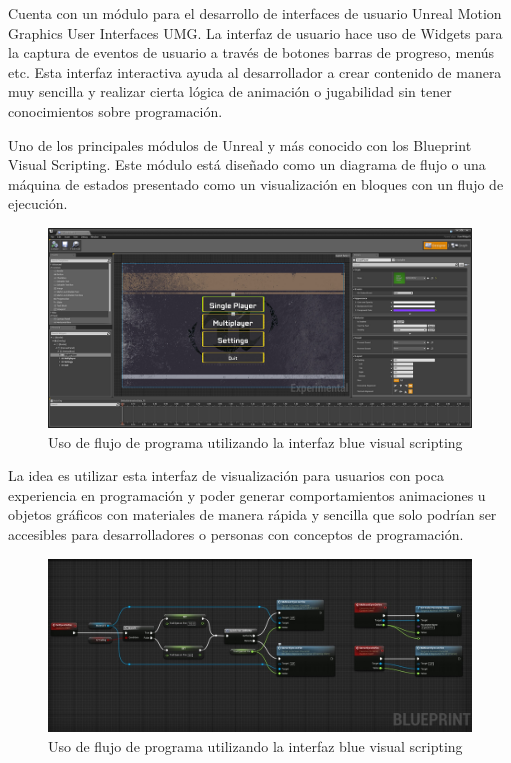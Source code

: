 \documentclass[a4paper, 17pt]{book}
\begin{document}
\vspace{1mm} %

Cuenta con un módulo para el desarrollo de interfaces de usuario Unreal Motion Graphics User Interfaces UMG.
La interfaz de usuario hace uso de Widgets para la captura de eventos de usuario a través de botones barras
de progreso, menús etc. Esta interfaz interactiva ayuda al desarrollador a crear contenido de manera muy
sencilla y realizar cierta lógica de animación o jugabilidad sin tener conocimientos sobre programación.

\vspace{1mm} %

Uno de los principales módulos de Unreal y más conocido con los Blueprint Visual Scripting. Este módulo
está diseñado como un diagrama de flujo o una máquina de estados presentado como un visualización en
bloques con un flujo de ejecución.

\begin{figure}[H]
    \centering
    \includegraphics[scale=0.30, keepaspectratio]{img/menu_unreal.png}
    \caption{Uso de flujo de programa utilizando la interfaz blue visual scripting}
    \label{figura:menu_unreal}
\end{figure}

La idea es utilizar esta interfaz de visualización para usuarios con poca experiencia en programación
y poder generar comportamientos animaciones u objetos gráficos con materiales de manera rápida y
sencilla que solo podrían ser accesibles para desarrolladores o personas con conceptos de programación.

\begin{figure}[H]
    \centering
    \includegraphics[scale=0.15, keepaspectratio]{img/option1_unreal.jpg}
    \caption{Uso de flujo de programa utilizando la interfaz blue visual scripting}
    \label{figura:option1_unreal}
\end{figure}
\end{document}

